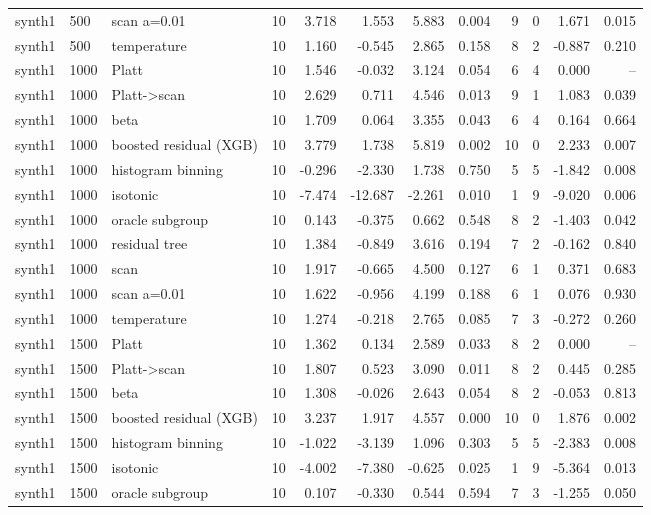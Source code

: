 \begin{tabular}{lllrrrrrrrrr}
synth1 & 500 & scan a=0.01 & 10 & 3.718 & 1.553 & 5.883 & 0.004 & 9 & 0 & 1.671 & 0.015 \\
synth1 & 500 & temperature & 10 & 1.160 & -0.545 & 2.865 & 0.158 & 8 & 2 & -0.887 & 0.210 \\
synth1 & 1000 & Platt & 10 & 1.546 & -0.032 & 3.124 & 0.054 & 6 & 4 & 0.000 & -- \\
synth1 & 1000 & Platt->scan & 10 & 2.629 & 0.711 & 4.546 & 0.013 & 9 & 1 & 1.083 & 0.039 \\
synth1 & 1000 & beta & 10 & 1.709 & 0.064 & 3.355 & 0.043 & 6 & 4 & 0.164 & 0.664 \\
synth1 & 1000 & boosted residual (XGB) & 10 & 3.779 & 1.738 & 5.819 & 0.002 & 10 & 0 & 2.233 & 0.007 \\
synth1 & 1000 & histogram binning & 10 & -0.296 & -2.330 & 1.738 & 0.750 & 5 & 5 & -1.842 & 0.008 \\
synth1 & 1000 & isotonic & 10 & -7.474 & -12.687 & -2.261 & 0.010 & 1 & 9 & -9.020 & 0.006 \\
synth1 & 1000 & oracle subgroup & 10 & 0.143 & -0.375 & 0.662 & 0.548 & 8 & 2 & -1.403 & 0.042 \\
synth1 & 1000 & residual tree & 10 & 1.384 & -0.849 & 3.616 & 0.194 & 7 & 2 & -0.162 & 0.840 \\
synth1 & 1000 & scan & 10 & 1.917 & -0.665 & 4.500 & 0.127 & 6 & 1 & 0.371 & 0.683 \\
synth1 & 1000 & scan a=0.01 & 10 & 1.622 & -0.956 & 4.199 & 0.188 & 6 & 1 & 0.076 & 0.930 \\
synth1 & 1000 & temperature & 10 & 1.274 & -0.218 & 2.765 & 0.085 & 7 & 3 & -0.272 & 0.260 \\
synth1 & 1500 & Platt & 10 & 1.362 & 0.134 & 2.589 & 0.033 & 8 & 2 & 0.000 & -- \\
synth1 & 1500 & Platt->scan & 10 & 1.807 & 0.523 & 3.090 & 0.011 & 8 & 2 & 0.445 & 0.285 \\
synth1 & 1500 & beta & 10 & 1.308 & -0.026 & 2.643 & 0.054 & 8 & 2 & -0.053 & 0.813 \\
synth1 & 1500 & boosted residual (XGB) & 10 & 3.237 & 1.917 & 4.557 & 0.000 & 10 & 0 & 1.876 & 0.002 \\
synth1 & 1500 & histogram binning & 10 & -1.022 & -3.139 & 1.096 & 0.303 & 5 & 5 & -2.383 & 0.008 \\
synth1 & 1500 & isotonic & 10 & -4.002 & -7.380 & -0.625 & 0.025 & 1 & 9 & -5.364 & 0.013 \\
synth1 & 1500 & oracle subgroup & 10 & 0.107 & -0.330 & 0.544 & 0.594 & 7 & 3 & -1.255 & 0.050 \\

\end{tabular}
